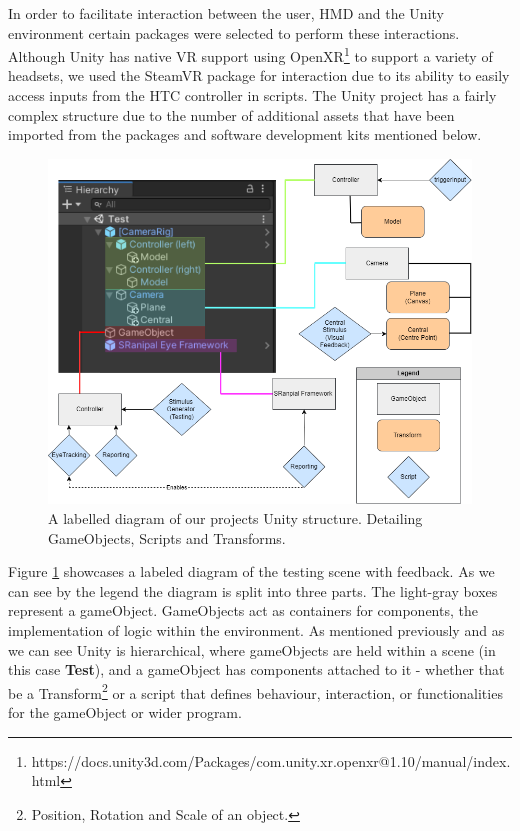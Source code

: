 \documentclass{l4proj}
\begin{document}
In order to facilitate interaction between the user, HMD and the Unity environment certain packages were selected to perform these interactions. Although Unity has native VR support using OpenXR\footnote{https://docs.unity3d.com/Packages/com.unity.xr.openxr@1.10/manual/index.html} to support a variety of headsets, we used the SteamVR package for interaction due to its ability to easily access inputs from the HTC controller in scripts. The Unity project has a fairly complex structure due to the number of additional assets that have been imported from the packages and software development kits mentioned below.
\begin{figure}[htbp]
    \centering
    \includegraphics[width=0.7\linewidth]{dissertation/images/Unity_Structure.png}    

    \caption{A labelled diagram of our projects Unity structure. Detailing GameObjects, Scripts and Transforms.}
    \label{fig:Unity_Structure} 
\end{figure}
\newline
Figure \ref{fig:Unity_Structure} showcases a labeled diagram of the testing scene with feedback. As we can see by the legend the diagram is split into three parts. The light-gray boxes represent a gameObject. GameObjects act as containers for components, the implementation of logic within the environment. As mentioned previously and as  we can see Unity is hierarchical, where gameObjects are held within a scene (in this case \textbf{Test}), and a gameObject has components attached to it - whether that be a Transform\footnote{Position, Rotation and Scale of an object.} or a script that defines behaviour, interaction, or functionalities for the gameObject or wider program. 
\end{document}
